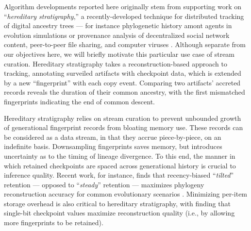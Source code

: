 
Algorithm developments reported here originally stem from supporting work on ``\textit{hereditary stratigraphy},'' a recently-developed technique for distributed tracking of digital ancestry trees --- for instance phylogenetic history amont agents in evolution simulations or provenance analysis of decentralized social network content, peer-to-peer file sharing, and computer viruses \citep{moreno2022hereditary}.
Although separate from our objectives here, we will briefly motivate this particular use case of stream curation.
Hereditary stratigraphy takes a reconstruction-based approach to tracking, annotating surveiled artifacts with checkpoint data, which is extended by a new ``fingerprint'' with each copy event.
Comparing two artifacts' accreted records reveals the duration of their common ancestry, with the first mismatched fingerprints indicating the end of common descent.

Hereditary stratigraphy relies on stream curation to prevent unbounded growth of generational fingerprint records from bloating memory use.
These records can be considered as a data stream, in that they accrue piece-by-piece, on an indefinite basis.
Downsampling fingerprints saves memory, but introduces uncertainty as to the timing of lineage divergence.
To this end, the manner in which retained checkpoints are spaced across generational history is crucial to inference quality.
Recent work, for instance, finds that recency-biased ``\textit{tilted}'' retention --- opposed to ``\textit{steady}'' retention --- maximizes phylogeny reconstruction accuracy for common evolutionary scenarios \citep{moreno2024guide}.
Minimizing per-item storage overhead is also critical to hereditary stratigraphy, with \citet{moreno2024guide} finding that single-bit checkpoint values maximize reconstruction quality (i.e., by allowing more fingerprints to be retained).
